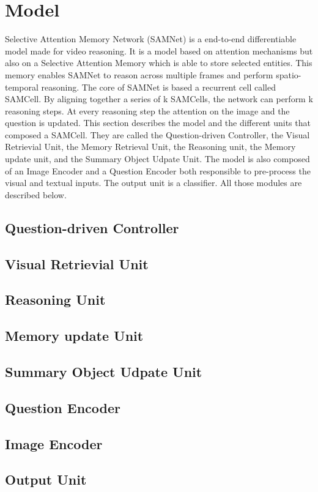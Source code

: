 \section{Model}


Selective Attention Memory Network (SAMNet) is a end-to-end differentiable model made for video reasoning. It is a model based on attention mechanisms but also on a Selective Attention Memory which is able to store selected entities. This memory enables SAMNet to reason across multiple frames and perform spatio-temporal reasoning. 
The core of SAMNet is based a recurrent cell called SAMCell. By aligning together a series of k SAMCells, the network can perform k reasoning steps. At every reasoning step the attention on the image and the question is updated. This section describes the model and the different units that composed a SAMCell. They are called the Question-driven Controller, the Visual Retrievial Unit, the Memory Retrieval Unit, the Reasoning unit, the Memory update unit, and the Summary Object Udpate Unit. 
The model is also composed of an Image Encoder and a Question Encoder both responsible to pre-process the visual and textual inputs. The output unit is a classifier.
All those modules are described below.

\subsection{Question-driven Controller}
\subsection{Visual Retrievial Unit}
\subsection{Reasoning Unit}
\subsection{Memory update Unit}
\subsection{Summary Object Udpate Unit}
\subsection{Question Encoder}
\subsection{Image Encoder}
\subsection{Output Unit}
